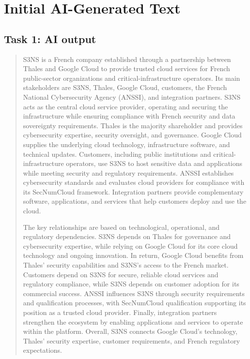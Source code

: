 \section{Initial AI-Generated Text}
\label{app:aitext}
\subsection{Task 1: AI output}
\begin{quote}\small
S3NS is a French company established through a partnership between Thales and Google Cloud to provide trusted cloud services for French public-sector organizations and critical-infrastructure operators. Its main stakeholders are S3NS, Thales, Google Cloud, customers, the French National Cybersecurity Agency (ANSSI), and integration partners. S3NS acts as the central cloud service provider, operating and securing the infrastructure while ensuring compliance with French security and data sovereignty requirements. Thales is the majority shareholder and provides cybersecurity expertise, security oversight, and governance. Google Cloud supplies the underlying cloud technology, infrastructure software, and technical updates. Customers, including public institutions and critical-infrastructure operators, use S3NS to host sensitive data and applications while meeting security and regulatory requirements. ANSSI establishes cybersecurity standards and evaluates cloud providers for compliance with its SecNumCloud framework. Integration partners provide complementary software, applications, and services that help customers deploy and use the cloud.

The key relationships are based on technological, operational, and regulatory dependencies. S3NS depends on Thales for governance and cybersecurity expertise, while relying on Google Cloud for its core cloud technology and ongoing innovation. In return, Google Cloud benefits from Thales' security capabilities and S3NS's access to the French market. Customers depend on S3NS for secure, reliable cloud services and regulatory compliance, while S3NS depends on customer adoption for its commercial success. ANSSI influences S3NS through security requirements and qualification processes, with SecNumCloud qualification supporting its position as a trusted cloud provider. Finally, integration partners strengthen the ecosystem by enabling applications and services to operate within the platform. Overall, S3NS connects Google Cloud's technology, Thales' security expertise, customer requirements, and French regulatory expectations.
\end{quote}

